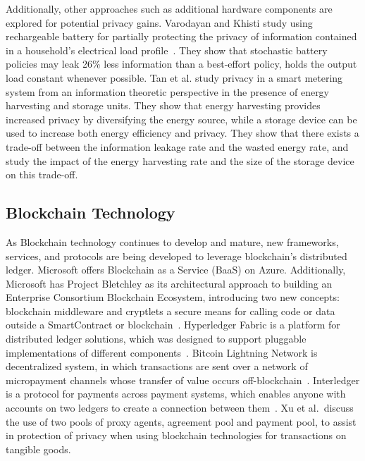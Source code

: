 Additionally, other approaches such as additional hardware components are explored for potential privacy gains. Varodayan and Khisti study using rechargeable battery for partially protecting the privacy of information contained in a household's electrical load profile~\cite{varodayan2011smart}.
They show that stochastic battery policies may leak 26\% less information than a best-effort policy, holds the output load constant whenever possible. Tan et al. study privacy in a smart metering system from an information theoretic perspective in the presence of energy harvesting and storage units\cite{tan2013increasing}. 
They show that energy harvesting provides increased privacy by diversifying the energy source, while a storage device can be used to increase both energy efficiency and privacy. 
They show that there exists a trade-off between the information leakage rate and the wasted energy rate, and study the impact of the energy harvesting rate and the size of the storage device on this trade-off.


\subsection{Blockchain Technology}

As Blockchain technology continues to develop and mature, new frameworks, services, and protocols are being developed to leverage blockchain's distributed ledger. Microsoft offers Blockchain as a Service (BaaS) on Azure. Additionally, Microsoft has Project Bletchley as its architectural approach to building an Enterprise Consortium Blockchain Ecosystem, introducing two new concepts: blockchain middleware and cryptlets a secure means for calling code or data outside a SmartContract or blockchain~\cite{gray2016introducing}. Hyperledger Fabric is a platform for distributed ledger solutions, which was designed to support pluggable implementations of different components~\cite{hyperledger2017fabric}. Bitcoin Lightning Network is decentralized system, in which transactions are sent over a network of micropayment channels whose transfer of value occurs off-blockchain~\cite{poon2016bitcoin}. Interledger is a protocol for payments across payment systems, which enables anyone with accounts on two ledgers to create
a connection between them~\cite{thomas_protocol}. Xu et al.\ discuss the use of two pools of proxy agents, agreement pool and payment pool, to assist in protection of privacy when using blockchain technologies for transactions on tangible goods.  \cite{Xu2017}


